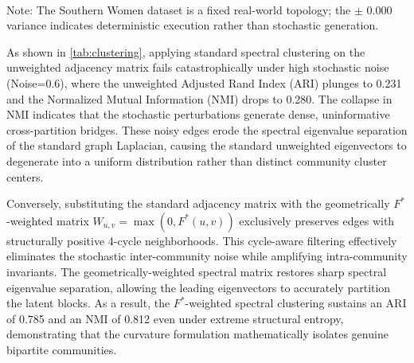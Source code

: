\documentclass{siuro250211}
\theoremstyle{remark}
\theoremstyle{plain}
\begin{document}
\begin{table}[h]
\centering
\caption{Community Detection Performance (Adjusted Rand Index and NMI)}
\label{tab:clustering}
\vspace{1ex} \\
{\footnotesize *Note: The Southern Women dataset is a fixed real-world topology; the $\pm$ 0.000 variance indicates deterministic execution rather than stochastic generation.}
\end{table}

As shown in \cref{tab:clustering}, applying standard spectral clustering on the unweighted adjacency matrix fails catastrophically under high stochastic noise (Noise=0.6), where the unweighted Adjusted Rand Index (ARI) plunges to 0.231 and the Normalized Mutual Information (NMI) drops to 0.280. The collapse in NMI indicates that the stochastic perturbations generate dense, uninformative cross-partition bridges. These noisy edges erode the spectral eigenvalue separation of the standard graph Laplacian, causing the standard unweighted eigenvectors to degenerate into a uniform distribution rather than distinct community cluster centers.

Conversely, substituting the standard adjacency matrix with the geometrically $F^*$-weighted matrix $W_{u,v} = \max(0, F^*(u,v))$ exclusively preserves edges with structurally positive 4-cycle neighborhoods. This cycle-aware filtering effectively eliminates the stochastic inter-community noise while amplifying intra-community invariants. The geometrically-weighted spectral matrix restores sharp spectral eigenvalue separation, allowing the leading eigenvectors to accurately partition the latent blocks. As a result, the $F^*$-weighted spectral clustering sustains an ARI of 0.785 and an NMI of 0.812 even under extreme structural entropy, demonstrating that the curvature formulation mathematically isolates genuine bipartite communities.
\end{document}
